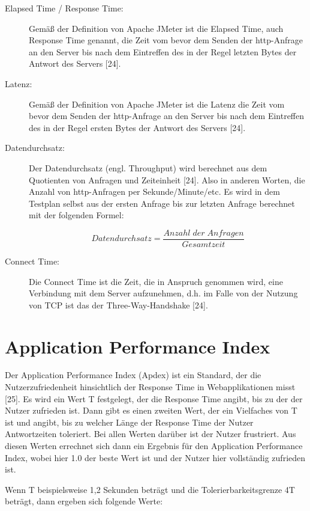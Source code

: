 \begin{description}
  \item[Elapsed Time / Response Time:] Gemäß der Definition von Apache JMeter ist die Elapsed Time, auch Response Time 
  genannt, die Zeit vom bevor dem Senden der http-Anfrage an den Server bis nach dem 
  Eintreffen des in der Regel letzten Bytes der Antwort des Servers [24]. 
  \item[Latenz:] Gemäß der Definition von Apache JMeter ist die Latenz die Zeit vom bevor dem Senden der 
  http-Anfrage an den Server bis nach dem Eintreffen des in der Regel ersten Bytes der 
  Antwort des Servers [24]. 
  \item[Datendurchsatz:] Der Datendurchsatz (engl. Throughput) wird berechnet aus dem Quotienten von Anfragen 
  und Zeiteinheit [24]. Also in anderen Worten, die Anzahl von http-Anfragen per 
  Sekunde/Minute/etc. Es wird in dem Testplan selbst aus der ersten Anfrage bis zur letzten 
  Anfrage berechnet mit der folgenden Formel:

  \begin{equation}
    Datendurchsatz = \frac{Anzahl\;der\;Anfragen}{Gesamtzeit} 
   \end{equation}

  \item[Connect Time:] Die Connect Time ist die Zeit, die in Anspruch genommen wird, eine Verbindung mit dem 
  Server aufzunehmen, d.h. im Falle von der Nutzung von TCP ist das der Three-Way-Handshake [24]. 
\end{description}

\section{Application Performance Index}
Der Application Performance Index (Apdex) ist ein Standard, der die Nutzerzufriedenheit 
hinsichtlich der Response Time in Webapplikationen misst [25]. Es wird ein Wert T 
festgelegt, der die Response Time angibt, bis zu der der Nutzer zufrieden ist. Dann gibt es 
einen zweiten Wert, der ein Vielfaches von T ist und angibt, bis zu welcher Länge der 
Response Time der Nutzer Antwortzeiten toleriert. Bei allen Werten darüber ist der Nutzer 
frustriert. Aus diesen Werten errechnet sich dann ein Ergebnis für den Application 
Performance Index, wobei hier 1.0 der beste Wert ist und der Nutzer hier vollständig 
zufrieden ist.\smallskip

Wenn T beispielsweise 1,2 Sekunden beträgt und die Tolerierbarkeitsgrenze 4T beträgt, 
dann ergeben sich folgende Werte:

